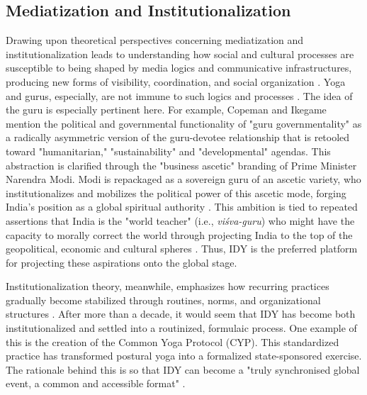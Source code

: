 \documentclass[11pt]{article}
\begin{document}
\subsection{Mediatization and Institutionalization}

Drawing upon theoretical perspectives concerning mediatization and institutionalization leads to understanding how social and cultural processes are susceptible to being shaped by media logics and communicative infrastructures, producing new forms of visibility, coordination, and social organization \cite{hjarvard2008}. Yoga and gurus, especially, are not immune to such logics and processes \cite{copeman2012,copeman2023}. The idea of the  guru is especially pertinent here. For example, Copeman and Ikegame \cite{copeman2012} mention the political and governmental functionality of "guru governmentality" as a radically asymmetric version of the guru-devotee relationship that is retooled toward "humanitarian," "sustainability" and "developmental" agendas. This abstraction is clarified through the "business ascetic" branding of Prime Minister Narendra Modi. Modi is repackaged as a sovereign guru of an ascetic variety, who institutionalizes and mobilizes the political power of this ascetic mode, forging India's position as a global spiritual authority \cite{maitra2022}. This ambition is tied to repeated assertions that India is the "world teacher" (i.e., \textit{viśva-guru}) who might have the capacity to morally correct the world through projecting India to the top of the geopolitical, economic and cultural spheres \cite{mannathukkaren2023,mccartney2023}. Thus, IDY is the preferred platform for projecting these aspirations onto the global stage.

Institutionalization theory, meanwhile, emphasizes how recurring practices gradually become stabilized through routines, norms, and organizational structures \cite{stavolo2026}. After more than a decade, it would seem that IDY has become both institutionalized and settled into a routinized, formulaic process. One example of this is the creation of the Common Yoga Protocol (CYP). This standardized practice has transformed postural yoga into a formalized state-sponsored exercise. The rationale behind this is so that IDY can become a "truly synchronised global event, a common and accessible format" \cite{pib_idy_2026}. 
\end{document}
